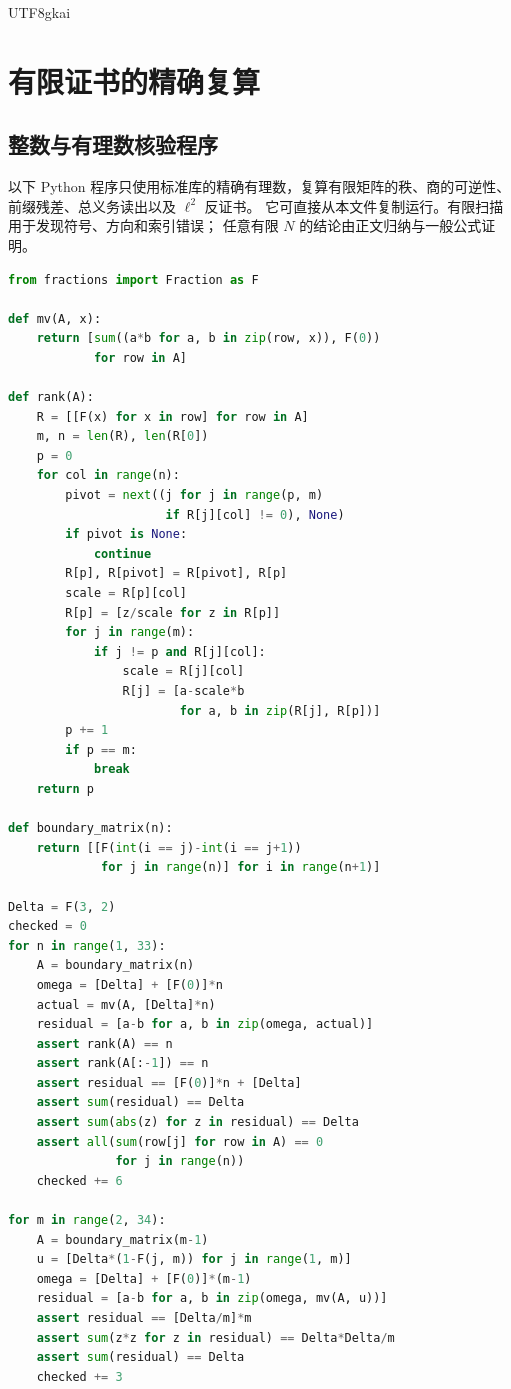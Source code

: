 \documentclass[12pt,a4paper,openany]{report}
\numberwithin{equation}{chapter}
\begin{document}
\begin{CJK*}{UTF8}{gkai}
\chapter{有限证书的精确复算}
\label{app:verification}

\section{整数与有理数核验程序}

以下 Python 程序只使用标准库的精确有理数，复算有限矩阵的秩、商的可逆性、
前缀残差、总义务读出以及 $\ell^2$ 反证书。
它可直接从本文件复制运行。有限扫描用于发现符号、方向和索引错误；
任意有限 $N$ 的结论由正文归纳与一般公式证明。

\begin{lstlisting}[language=Python]
from fractions import Fraction as F

def mv(A, x):
    return [sum((a*b for a, b in zip(row, x)), F(0))
            for row in A]

def rank(A):
    R = [[F(x) for x in row] for row in A]
    m, n = len(R), len(R[0])
    p = 0
    for col in range(n):
        pivot = next((j for j in range(p, m)
                      if R[j][col] != 0), None)
        if pivot is None:
            continue
        R[p], R[pivot] = R[pivot], R[p]
        scale = R[p][col]
        R[p] = [z/scale for z in R[p]]
        for j in range(m):
            if j != p and R[j][col]:
                scale = R[j][col]
                R[j] = [a-scale*b
                        for a, b in zip(R[j], R[p])]
        p += 1
        if p == m:
            break
    return p

def boundary_matrix(n):
    return [[F(int(i == j)-int(i == j+1))
             for j in range(n)] for i in range(n+1)]

Delta = F(3, 2)
checked = 0
for n in range(1, 33):
    A = boundary_matrix(n)
    omega = [Delta] + [F(0)]*n
    actual = mv(A, [Delta]*n)
    residual = [a-b for a, b in zip(omega, actual)]
    assert rank(A) == n
    assert rank(A[:-1]) == n
    assert residual == [F(0)]*n + [Delta]
    assert sum(residual) == Delta
    assert sum(abs(z) for z in residual) == Delta
    assert all(sum(row[j] for row in A) == 0
               for j in range(n))
    checked += 6

for m in range(2, 34):
    A = boundary_matrix(m-1)
    u = [Delta*(1-F(j, m)) for j in range(1, m)]
    omega = [Delta] + [F(0)]*(m-1)
    residual = [a-b for a, b in zip(omega, mv(A, u))]
    assert residual == [Delta/m]*m
    assert sum(z*z for z in residual) == Delta*Delta/m
    assert sum(residual) == Delta
    checked += 3


\end{lstlisting}
\end{CJK*}
\end{document}
